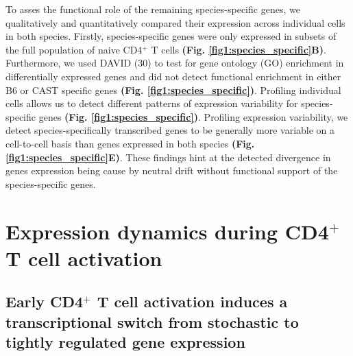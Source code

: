 To asses the functional role of the remaining species-specific genes, we qualitatively and quantitatively compared their expression across individual cells in both species. Firstly, species-specific genes were only expressed in subsets of the full population of naive CD4$^+$ T cells \textbf{(Fig. \ref{fig1:species_specific}B)}. Furthermore, we used DAVID (30) to test for gene ontology (GO) enrichment in differentially expressed genes and did not detect functional enrichment in either B6 or CAST specific genes \textbf{(Fig. \ref{fig1:species_specific})}. Profiling individual cells allows us to detect different patterns of expression variability for species-specific genes \textbf{(Fig. \ref{fig1:species_specific})}. Profiling expression variability, we detect species-specifically transcribed genes to be generally more variable on a cell-to-cell basis than genes expressed in both species \textbf{(Fig. \ref{fig1:species_specific}E)}. These findings hint at the detected divergence in genes expression being cause by neutral drift without functional support of the species-specific genes.

\section{Expression dynamics during CD4$^+$ T cell activation}
\subsection*{Early CD4$^+$ T cell activation induces a transcriptional switch from stochastic to tightly regulated gene expression} \label{sec1:Tcell_activation}

